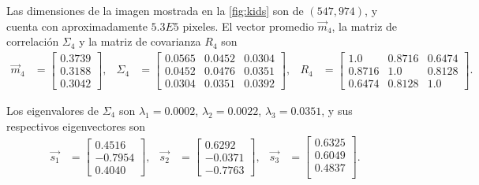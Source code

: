 Las dimensiones de la imagen mostrada en la \cref{fig:kids} son de $(547, 974)$, y cuenta con aproximadamente $5.3E5$ pixeles. El vector promedio $\vec{m}_4$, la matriz de correlación $\Sigma_4$ y la matriz de covarianza $R_4$ son
\begin{align*}
    \vec{m}_4 & =
    \begin{bmatrix}
        0.3739 \\
        0.3188 \\
        0.3042
    \end{bmatrix}, &
    \Sigma_4 & =
    \begin{bmatrix}
        0.0565 & 0.0452 & 0.0304 \\
        0.0452 & 0.0476 & 0.0351 \\
        0.0304 & 0.0351 & 0.0392
    \end{bmatrix}, &
    R_4 & = 
    \begin{bmatrix}
        1.0    & 0.8716 & 0.6474 \\
        0.8716 & 1.0    & 0.8128 \\
        0.6474 & 0.8128 & 1.0
    \end{bmatrix}.
\end{align*}

Los eigenvalores de $\Sigma_4$ son $\lambda_1 = 0.0002$, $\lambda_2 = 0.0022$, $\lambda_3 = 0.0351$, y sus respectivos eigenvectores son
\begin{align*}
    \vec{s_1} & =
    \begin{bmatrix}
        0.4516 \\
        -0.7954 \\
         0.4040
    \end{bmatrix}, &
    \vec{s_2} & = 
    \begin{bmatrix}
        0.6292 \\
        -0.0371 \\
        -0.7763
    \end{bmatrix}, &
    \vec{s_3} & =
    \begin{bmatrix}
        0.6325 \\
        0.6049 \\
        0.4837 \\
    \end{bmatrix}.
\end{align*}

